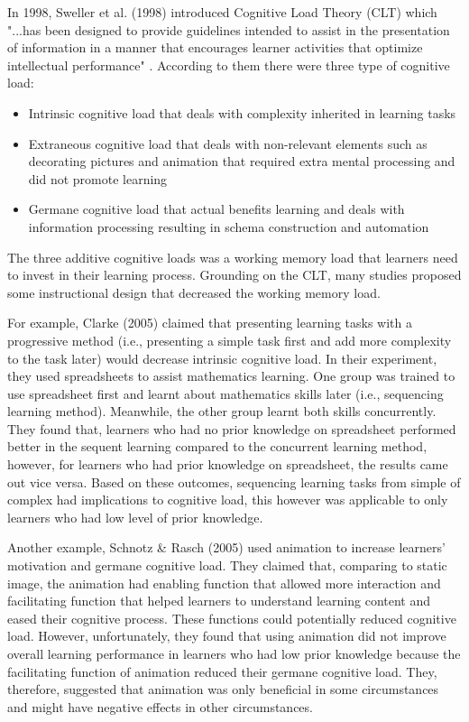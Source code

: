 In 1998, Sweller et al. (1998) \cite{sweller1998cognitive} introduced Cognitive Load Theory (CLT) which "...has been designed to provide guidelines intended to assist in the presentation of information in a manner that encourages learner activities that optimize intellectual performance" \cite[pp. 251]{sweller1998cognitive}. According to them there were three type of cognitive load: 
\begin{itemize}
\item Intrinsic cognitive load that deals with complexity inherited in learning tasks 
\item Extraneous cognitive load that deals with non-relevant elements such as decorating pictures and animation that required extra mental processing and did not promote learning 
\item Germane cognitive load that actual benefits learning and deals with information processing resulting in schema construction and automation 
\end{itemize}

The three additive cognitive loads was a working memory load that learners need to invest in their learning process. Grounding on the CLT, many studies proposed some instructional design that decreased the working memory load. 

For example, Clarke (2005) \cite{clarke2005impact} claimed that presenting learning tasks with a progressive method (i.e., presenting a simple task first and add more complexity to the task later) would decrease intrinsic cognitive load. In their experiment, they used spreadsheets to assist mathematics learning. One group was trained to use spreadsheet first and learnt about mathematics skills  later (i.e., sequencing learning method). Meanwhile, the other group learnt both skills concurrently. They found that, learners who had no prior knowledge on spreadsheet performed better in the sequent learning compared to the concurrent learning method, however, for learners who had prior knowledge on spreadsheet, the results came out vice versa. Based on these outcomes, sequencing learning tasks from simple of complex had implications to cognitive load, this however was applicable to only learners who had low level of prior knowledge. 

Another example, Schnotz \& Rasch (2005) \cite{schnotz2005enabling} used animation to increase learners' motivation and germane cognitive load. They claimed that, comparing to static image, the animation had enabling function that allowed more interaction and facilitating function that helped learners to understand learning content and eased their cognitive process. These functions could potentially reduced cognitive load. However, unfortunately, they found that using animation did not improve overall learning performance in learners who had low prior knowledge because the facilitating function of animation reduced their germane cognitive load. They, therefore, suggested that animation was only beneficial in some circumstances and might have negative effects in other circumstances. 

